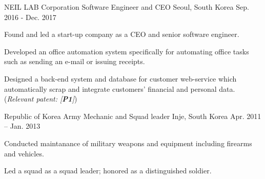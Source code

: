 


\begin{cventries}

\cventry
{NEIL LAB Corporation} %
{Software Engineer and CEO} %
{Seoul, South Korea} %
{Sep. 2016 - Dec. 2017} %
{ %
\begin{cvitems}
\item {Found and led a start-up company as a CEO and senior software engineer.}
\item {Developed an office automation system specifically for automating office tasks such as sending an e-mail or issuing receipts.}
\item {Designed a back-end system and database for customer web-service which automatically scrap and integrate customers' financial and personal data. (\textit{Relevant patent: [\textbf{P1}]})}
\end{cvitems}
}

\cventry
{Republic of Korea Army} %
{Mechanic and Squad leader} %
{Inje, South Korea} %
{Apr. 2011 – Jan. 2013} %
{ %
\begin{cvitems}
\item {Conducted maintanance of military weapons and equipment including firearms and vehicles.}
\item {Led a squad as a squad leader; honored as a distinguished soldier.}
\end{cvitems}
}


\end{cventries}
